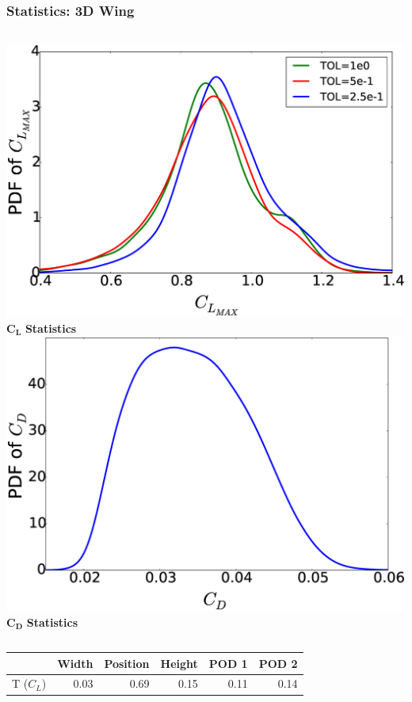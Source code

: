 \documentclass[9pt]{beamer}
\begin{document}
\begin{frame}
\frametitle{Statistics: 3D Wing}
\label{sec-3-8}


\begin{columns}[c]
    \centering
    \includegraphics[width=1\textwidth]{PDFCLMAX} \\
    $\bm{C_L}$ {\bf Statistics}
    \centering
    \includegraphics[width=1\textwidth]{PDFCDMAX} \\
    $\bm{C_D}$ {\bf Statistics}
\end{columns}



\begin{center}
\begin{tabular}{lrrrrr}
            &  Width  &  Position  &  Height  &  POD 1  &  POD 2  \\
\hline
 T ($C_L$)  &   0.03  &      0.69  &    0.15  &   0.11  &   0.14  \\
\end{tabular}
\end{center}




\end{frame}
\end{document}
